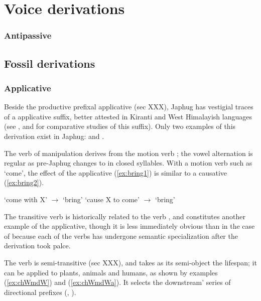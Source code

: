 \chapter{Voice derivations}

\subsection{Antipassive} \label{sec:antipassive}
\section{Fossil derivations}

\subsection{Applicative }
Beside the productive prefixal  applicative (sec XXX), Japhug has vestigial traces of a  applicative suffix, better attested in Kiranti and West Himalayish languages (see \citealt{michailovsky85dental}, \citet{jacques15derivational.khaling} and \citealt{jacques16ssuffixes} for comparative studies of this suffix). Only two examples of this derivation exist in Japhug:  and . 

The verb of manipulation  derives from the motion verb ; the vowel alternation is regular as pre-Japhug  changes to  in closed syllables. With a motion verb such as `come', the effect of the applicative (\ref{ex:bring1}) is similar to a causative  (\ref{ex:bring2}). 

\begin{exe}
\ex \label{ex:bring1}
\glt `come with X' $\rightarrow$ `bring'
\ex \label{ex:bring2}
\glt `cause X to come' $\rightarrow$ `bring'
\end{exe}

The transitive verb  is historically related to the verb , and constitutes another example of the  applicative, though it is less immediately obvious than in the case of  because each of the verbs has undergone semantic specialization after the derivation took palce.

The verb  is semi-transitive (sec XXX), and takes as its semi-object the lifespan; it can be applied to plants, animals and humans, as shown by examples (\ref{ex:chWmdW}) and (\ref{ex:chWmdWa}). It selects the  downstream' series of directional prefixes (, ).

